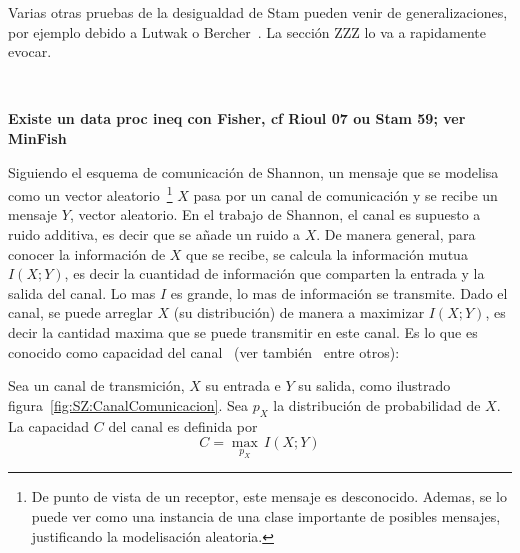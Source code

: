 Varias otras pruebas de la desigualdad de Stam pueden venir de generalizaciones,
por ejemplo debido a Lutwak o Bercher~\cite{Lut, Ber}. {\color{red} La secci\'on
  ZZZ lo va a rapidamente evocar.}

\

{\color{red}\bf Existe un data proc ineq con Fisher, cf Rioul 07 ou Stam 59; ver
  MinFish}




\label{s:SZ:Ejemplos}



\label{sec:SZ:CanalCapacidad}

Siguiendo el  esquema de comunicaci\'on de  Shannon, un mensaje  que se modelisa
como  un vector  aleatorio~\footnote{De  punto  de vista  de  un receptor,  este
  mensaje es  desconocido. Ademas,  se lo  puede ver como  una instancia  de una
  clase  importante   de  posibles  mensajes,   justificando  la  modelisaci\'on
  aleatoria.} $X$  pasa por un  canal de comunicaci\'on  y se recibe  un mensaje
$Y$, vector  aleatorio. En el trabajo de  Shannon, el canal es  supuesto a ruido
additiva,  es decir que  se a\~nade  un ruido  a $X$.   De manera  general, para
conocer la informaci\'on de $X$ que se recibe, se calcula la informaci\'on mutua
$I(X;Y)$, es decir  la cuantidad de informaci\'on que comparten  la entrada y la
salida del canal.   Lo mas $I$ es grande, lo mas  de informaci\'on se transmite.
Dado el canal,  se puede arreglar $X$ (su distribuci\'on)  de manera a maximizar
$I(X;Y)$, es decir la cantidad maxima  que se puede transmitir en este canal. Es
lo que  es conocido como capacidad  del canal~\cite[part.~II~\&~III]{Sha48} (ver
tambi\'en~\cite{CovTho06, Rio07} entre otros):
%
\begin{definicion}
  Sea un canal de transmici\'on, $X$  su entrada e $Y$ su salida, como ilustrado
  figura~\ref{fig:SZ:CanalComunicacion}.   Sea   $p_X$   la  distribuci\'on   de
  probabilidad  de  $X$. La  capacidad  $C$  del canal  es  definida  por
  \[
  C = \max_{p_X} \, I(X;Y)
  \]
\end{definicion}


